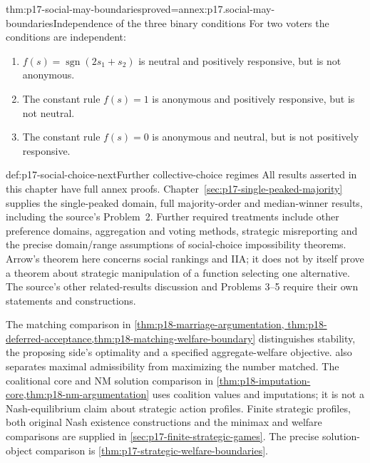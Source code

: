 \begin{hbtheorem}{thm:p17-social-may-boundaries}{proved=annex:p17.social-may-boundaries}{Independence of the three binary conditions}
For two voters the conditions are independent:
\begin{enumerate}
\item \(f(s)=\operatorname{sgn}(2s_1+s_2)\) is neutral and positively
      responsive, but is not anonymous.
\item The constant rule \(f(s)=1\) is anonymous and positively responsive,
      but is not neutral.
\item The constant rule \(f(s)=0\) is anonymous and neutral, but is not
      positively responsive.
\end{enumerate}
\end{hbtheorem}

\begin{proofboundary}{def:p17-social-choice-next}{Further collective-choice regimes}
All results asserted in this chapter have full annex proofs.
Chapter~\ref{sec:p17-single-peaked-majority} supplies the single-peaked
domain, full majority-order and median-winner results, including the
source's Problem~2. Further required treatments include other preference
domains, aggregation and voting methods, strategic misreporting and
the precise domain/range assumptions of social-choice impossibility
theorems. Arrow's theorem here concerns social rankings and IIA; it does
not by itself prove a theorem about strategic manipulation of a function
selecting one alternative. The source's other related-results discussion
and Problems 3--5 require their own statements and constructions.

The matching comparison in \cref{thm:p18-marriage-argumentation,
thm:p18-deferred-acceptance,thm:p18-matching-welfare-boundary}
distinguishes stability, the proposing side's optimality and a specified
aggregate-welfare objective.  also
separates maximal admissibility from maximizing the number matched.
The coalitional core and NM solution comparison in
\cref{thm:p18-imputation-core,thm:p18-nm-argumentation}
uses coalition values and imputations; it is not a Nash-equilibrium
claim about strategic action profiles.
Finite strategic profiles, both original Nash existence constructions
and the minimax and welfare comparisons are supplied in
\cref{sec:p17-finite-strategic-games}. The precise solution-object
comparison is \cref{thm:p17-strategic-welfare-boundaries}.
\end{proofboundary}
